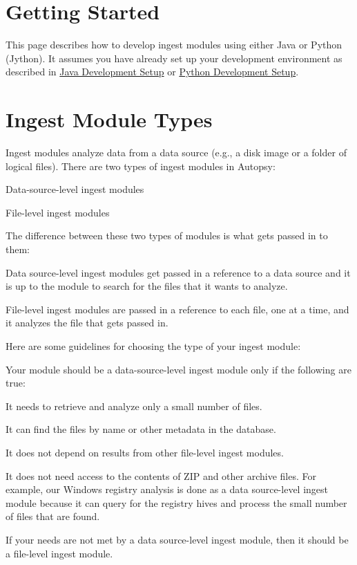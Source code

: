 \hypertarget{mod_ingest_page_ingest_modules_getting_started}{}\section{Getting Started}\label{mod_ingest_page_ingest_modules_getting_started}
This page describes how to develop ingest modules using either Java or Python (Jython). It assumes you have already set up your development environment as described in \hyperlink{mod_dev_page}{Java Development Setup} or \hyperlink{mod_dev_py_page}{Python Development Setup}.\hypertarget{mod_ingest_page_ingest_module_types}{}\section{Ingest Module Types}\label{mod_ingest_page_ingest_module_types}
Ingest modules analyze data from a data source (e.\+g., a disk image or a folder of logical files). There are two types of ingest modules in Autopsy\+:


\begin{DoxyItemize}
\item Data-\/source-\/level ingest modules
\item File-\/level ingest modules
\end{DoxyItemize}

The difference between these two types of modules is what gets passed in to them\+:
\begin{DoxyItemize}
\item Data source-\/level ingest modules get passed in a reference to a data source and it is up to the module to search for the files that it wants to analyze.
\item File-\/level ingest modules are passed in a reference to each file, one at a time, and it analyzes the file that gets passed in.
\end{DoxyItemize}

Here are some guidelines for choosing the type of your ingest module\+:


\begin{DoxyItemize}
\item Your module should be a data-\/source-\/level ingest module only if the following are true\+:
\begin{DoxyItemize}
\item It needs to retrieve and analyze only a small number of files.
\item It can find the files by name or other metadata in the database.
\item It does not depend on results from other file-\/level ingest modules.
\item It does not need access to the contents of Z\+IP and other archive files. For example, our Windows registry analysis is done as a data source-\/level ingest module because it can query for the registry hives and process the small number of files that are found.
\end{DoxyItemize}
\item If your needs are not met by a data source-\/level ingest module, then it should be a file-\/level ingest module.
\end{DoxyItemize}

